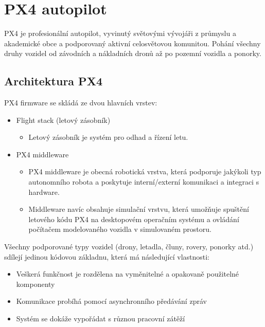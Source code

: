 \chapter{PX4 autopilot}

PX4 je profesionální autopilot, vyvinutý světovými vývojáři z průmyslu a akademické obce a podporovaný aktivní celosvětovou komunitou. Pohání všechny druhy vozidel od závodních a nákladních dronů až po pozemní vozidla a ponorky. 

\section{Architektura PX4}

PX4 firmware se skládá ze dvou hlavních vrstev:
\begin{itemize}
    \item Flight stack (letový zásobník)
    \begin{itemize}
        \item Letový zásobník je systém pro odhad a řízení letu.
    \end{itemize}
    \item PX4 middleware
    \begin{itemize}
        \item PX4 middleware je obecná robotická vrstva, která podporuje jakýkoli typ autonomního robota a poskytuje interní/externí komunikaci a integraci s hardware.
        \item Middleware navíc obsahuje simulační vrstvu, která umožňuje spuštění letového kódu PX4 na desktopovém operačním systému a ovládání počítačem modelovaného vozidla v simulovaném prostoru.\\
    \end{itemize}
\end{itemize}

Všechny podporované typy vozidel (drony, letadla, čluny, rovery, ponorky atd.) sdílejí jedinou kódovou základnu, která má následující vlastnosti: \cite{PX4main}

\begin{itemize}
    \item Veškerá funkčnost je rozdělena na vyměnitelné a opakovaně použitelné komponenty
    \item Komunikace probíhá pomocí asynchronního předávání zpráv
    \item Systém se dokáže vypořádat s různou pracovní zátěží\\
\end{itemize}

